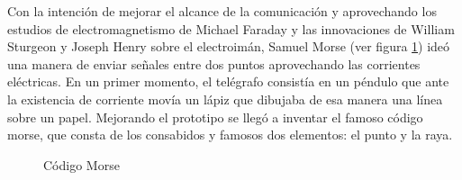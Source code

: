 Con la intención de mejorar el alcance de la comunicación y aprovechando los estudios de electromagnetismo de Michael Faraday y las innovaciones de William Sturgeon y Joseph Henry sobre el electroimán, Samuel Morse (ver figura \ref{fig:telegrafo}) ideó una manera de enviar señales entre dos puntos aprovechando las corrientes eléctricas. En un primer momento, el telégrafo consistía en un péndulo que ante la existencia de corriente movía un lápiz que dibujaba de esa manera una línea sobre un papel. Mejorando el prototipo se llegó a inventar el famoso código morse, que consta de los consabidos y famosos dos elementos: el punto y la raya.

\begin{figure}[h!btp]
	\begin{adjustbox}{minipage=\linewidth, fbox}
		\centering
		\hspace{10mm}
	\end{adjustbox}
\caption{Código Morse}
	\label{fig:telegrafo}
\end{figure}

